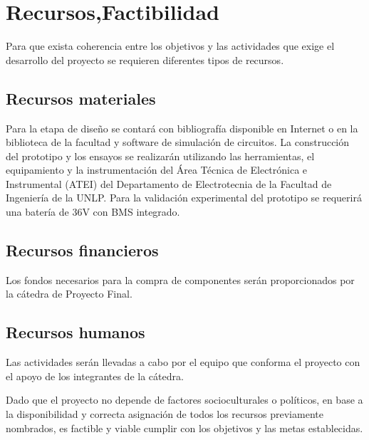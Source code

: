 \section{Recursos,Factibilidad}

Para que exista coherencia entre los objetivos y las actividades que exige el desarrollo del proyecto se requieren diferentes tipos de recursos. 

\subsection{Recursos materiales}
Para la etapa de diseño se contará con bibliografía disponible en Internet o en la biblioteca de la facultad y software de simulación de circuitos.
La construcción del prototipo y los ensayos se realizarán utilizando las herramientas, el equipamiento y la instrumentación del 
Área Técnica de Electrónica e Instrumental (ATEI) del Departamento de Electrotecnia de la Facultad de Ingeniería de la UNLP. 
Para la validación experimental del prototipo se requerirá una batería de 36V con BMS integrado. 

\subsection{Recursos financieros}
Los fondos necesarios para la compra de componentes serán proporcionados por la cátedra de Proyecto Final.

\subsection{Recursos humanos}
Las actividades serán llevadas a cabo por el equipo que conforma el proyecto con el apoyo de los integrantes de la cátedra.

Dado que el proyecto no depende de factores socioculturales o políticos, en base a la disponibilidad y correcta asignación
de todos los recursos previamente nombrados, es factible y viable cumplir con los objetivos y las metas establecidas. 